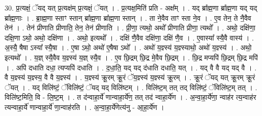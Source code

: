 \documentclass[17pt]{extarticle}
\begin{document}
30. प्र॒त्यक्षं॒ ॅयद् यत् प्र॒त्यक्ष॑म् प्र॒त्यक्षं॒ ॅयत् । . प्र॒त्यक्ष॒मिति॑ प्रति - अक्ष᳚म् । . यद् ब्रा᳚ह्म॒णा ब्रा᳚ह्म॒णा यद् यद् ब्रा᳚ह्म॒णाः । . ब्रा॒ह्म॒णा स्ताꣳ स्तान् ब्रा᳚ह्म॒णा ब्रा᳚ह्म॒णा स्तान् । . ता ने॒वैव ताꣳ स्ता ने॒व । . ए॒व तेन॒ ते नै॒वैव तेन॑ । . तेन॑ प्रीणाति प्रीणाति॒ तेन॒ तेन॑ प्रीणाति । . प्री॒णा॒ त्यथो॒ अथो᳚ प्रीणाति प्रीणा॒ त्यथो᳚ । . अथो॒ दक्षि॑णा॒ दक्षि॒णा ऽथो॒ अथो॒ दक्षि॑णा । . अथो॒ इत्यथो᳚ । . दक्षि॑ णै॒वैव दक्षि॑णा॒ दक्षि॑ णै॒व । . ए॒वास्या᳚ स्यै॒वै वास्य॑ । . अ॒स्यै॒ षैषा ऽस्या᳚ स्यै॒षा । . ए॒षा ऽथो॒ अथो॑ ए॒षैषा ऽथो᳚ । . अथो॑ य॒ज्ञ्स्य॑ य॒ज्ञ्स्याथो॒ अथो॑ य॒ज्ञ्स्य॑ । . अथो॒ इत्यथो᳚ । . य॒ज्ञ् स्यै॒वैव य॒ज्ञ्स्य॑ य॒ज्ञ् स्यै॒व । . ए॒व छि॒द्रम् छि॒द्र मे॒वैव छि॒द्रम् । . छि॒द्र मप्यपि॑ छि॒द्रम् छि॒द्र मपि॑ । . अपि॑ दधाति दधा॒ त्यप्यपि॑ दधाति । . द॒धा॒ति॒ यद् यद् द॑धाति दधाति॒ यत् । . यद् वै वै यद् यद् वै । . वै य॒ज्ञ्स्य॑ य॒ज्ञ्स्य॒ वै वै य॒ज्ञ्स्य॑ । . य॒ज्ञ्स्य॑ क्रू॒रम् क्रू॒रं ॅय॒ज्ञ्स्य॑ य॒ज्ञ्स्य॑ क्रू॒रम् । . क्रू॒रं ॅयद् यत् क्रू॒रम् क्रू॒रं ॅयत् । . यद् विलि॑ष्टं॒ ॅविलि॑ष्टं॒ ॅयद् यद् विलि॑ष्टम् । . विलि॑ष्ट॒म् तत् तद् विलि॑ष्टं॒ ॅविलि॑ष्ट॒म् तत् । . विलि॑ष्ट॒मिति॒ वि - लि॒ष्ट॒म् । . त द॑न्वाहा॒र्ये॑ णान्वाहा॒र्ये॑ण॒ तत् तद॑ न्वाहा॒र्ये॑ण । . अ॒न्वा॒हा॒र्ये॑णा॒ न्वाह॑र त्य॒न्वाह॑र त्यन्वाहा॒र्ये॑ णान्वाहा॒र्ये॑ णा॒न्वाह॑रति । . अ॒न्वा॒हा॒र्ये॑णेत्य॑नु - आ॒हा॒र्ये॑ण । \newline
\end{document}
